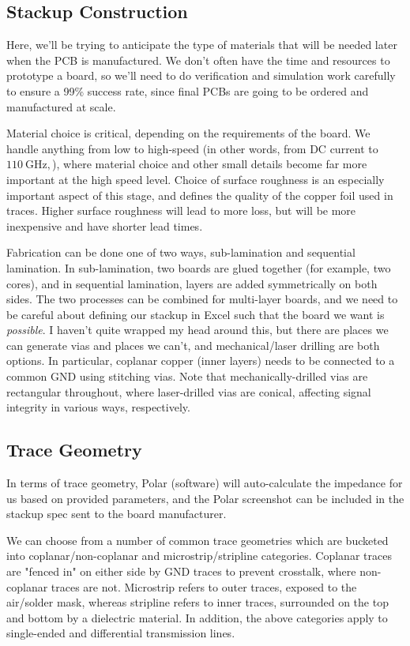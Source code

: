 \documentclass{article}
\begin{document}
\subsection{Stackup Construction}
Here, we'll be trying to anticipate the type of materials that will be needed later when the PCB is manufactured. We don't often have the time and resources to prototype a board, so we'll need to do verification and simulation work carefully to ensure a 99\% success rate, since final PCBs are going to be ordered and manufactured at scale.

Material choice is critical, depending on the requirements of the board. We handle anything from low to high-speed (in other words, from DC current to \(110 \ \mathrm{GHz},\)), where material choice and other small details become far more important at the high speed level. Choice of surface roughness is an especially important aspect of this stage, and defines the quality of the copper foil used in traces. Higher surface roughness will lead to more loss, but will be more inexpensive and have shorter lead times. 

Fabrication can be done one of two ways, sub-lamination and sequential lamination. In sub-lamination, two boards are glued together (for example, two cores), and in sequential lamination, layers are added symmetrically on both sides. The two processes can be combined for multi-layer boards, and we need to be careful about defining our stackup in Excel such that the board we want is \textit{possible}. I haven't quite wrapped my head around this, but there are places we can generate vias and places we can't, and mechanical/laser drilling are both options. In particular, coplanar copper (inner layers) needs to be connected to a common GND using stitching vias. Note that mechanically-drilled vias are rectangular throughout, where laser-drilled vias are conical, affecting signal integrity in various ways, respectively.

\subsection{Trace Geometry}

In terms of trace geometry, Polar (software) will auto-calculate the impedance for us based on provided parameters, and the Polar screenshot can be included in the stackup spec sent to the board manufacturer. 

We can choose from a number of common trace geometries which are bucketed into coplanar/non-coplanar and microstrip/stripline categories. Coplanar traces are "fenced in" on either side by GND traces to prevent crosstalk, where non-coplanar traces are not. Microstrip refers to outer traces, exposed to the air/solder mask, whereas stripline refers to inner traces, surrounded on the top and bottom by a dielectric material. In addition, the above categories apply to single-ended and differential transmission lines. 
\end{document}
